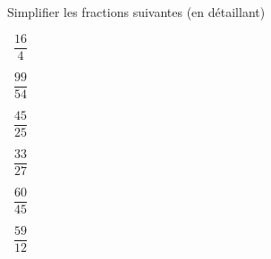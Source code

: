 	Simplifier les fractions suivantes (en détaillant)
	\begin{questions}
	
		\question[2]  $\dfrac{16}{4}$
		\fillwithdottedlines{1.5cm}
		\begin{solution}
			
		\end{solution}
	
		\question[2]  $\dfrac{99}{54}$
		\fillwithdottedlines{1.5cm}
		\begin{solution}
			
		\end{solution}
	
	
		
	
		\question[2]  $\dfrac{45}{25}$
		\fillwithdottedlines{1.5cm}
		\begin{solution}
			
		\end{solution}
	
	
		\question[2]  $\dfrac{33}{27}$
		\fillwithdottedlines{1.5cm}
		\begin{solution}
			
		\end{solution}
	
	
		\question[2]  $\dfrac{60}{45}$
		\fillwithdottedlines{1.5cm}
		\begin{solution}
			
		\end{solution}
	
	
	
	
		\question[2]  $\dfrac{59}{12}$
		\fillwithdottedlines{1.5cm}
		\begin{solution}
			
		\end{solution}
	\end{questions}
	
	
